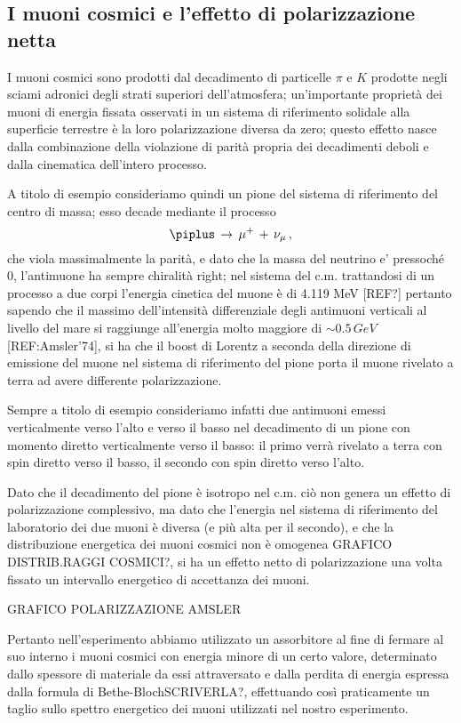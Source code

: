 \subsection{I muoni cosmici e l'effetto di polarizzazione netta}
I muoni cosmici sono prodotti dal decadimento di particelle $\pi$ e $K$ prodotte negli sciami adronici degli strati superiori dell'atmosfera; un'importante proprietà dei muoni di energia fissata osservati in un sistema di riferimento solidale alla superficie terrestre è la loro polarizzazione diversa da zero; questo effetto nasce dalla combinazione della violazione di parità propria dei decadimenti deboli e dalla cinematica dell'intero processo. \par
A titolo di esempio consideriamo quindi un pione del sistema di riferimento del centro di massa; esso decade mediante il processo
\begin{equation}
	\piplus \, \to \, \mu^+ \, + \, \nu_{\mu} \, ,
	\label{eq:pi_decay}
\end{equation}
che viola massimalmente la parità, e dato che la massa del neutrino e' pressoch\'e 0, l'antimuone ha sempre chiralità right; nel sistema del c.m. trattandosi di un processo a due corpi l'energia cinetica del muone è di 4.119 MeV [REF?] pertanto sapendo che il massimo dell'intensità differenziale degli antimuoni verticali al livello del mare si raggiunge all'energia molto maggiore di $\sim 0.5 \, GeV$  [REF:Amsler'74], si ha che il boost di Lorentz a seconda della direzione di emissione del muone nel sistema di riferimento del pione porta il muone rivelato a terra ad avere differente polarizzazione. \par
Sempre a titolo di esempio consideriamo infatti due antimuoni emessi verticalmente verso l'alto e verso il basso nel decadimento di un pione con momento diretto verticalmente verso il basso:
il primo verrà rivelato a terra con spin diretto verso il basso, il secondo con spin diretto verso l'alto. \par
Dato che il decadimento del pione è isotropo nel c.m. ciò non genera un effetto di polarizzazione complessivo, ma dato che l'energia nel sistema di riferimento del laboratorio dei due muoni è diversa (e più alta per il secondo), e che la distribuzione energetica dei muoni cosmici non è omogenea GRAFICO DISTRIB.RAGGI COSMICI?, si ha un effetto netto di polarizzazione una volta fissato un intervallo energetico di accettanza dei muoni. \par
GRAFICO POLARIZZAZIONE AMSLER \par
Pertanto nell'esperimento abbiamo utilizzato un assorbitore al fine di fermare al suo interno i muoni cosmici con energia minore di un certo valore, determinato dallo spessore di materiale da essi attraversato e dalla perdita di energia espressa dalla formula di Bethe-BlochSCRIVERLA?, effettuando così praticamente un taglio sullo spettro energetico dei muoni utilizzati nel nostro esperimento. \par
